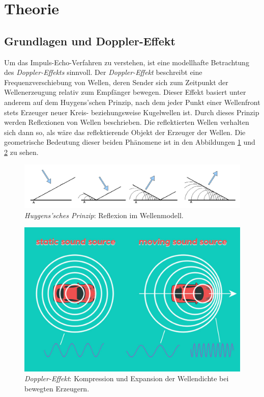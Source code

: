 \section{Theorie}
\label{sec:Theorie}
\subsection{Grundlagen und Doppler-Effekt}
Um das Impuls-Echo-Verfahren zu verstehen, ist eine modellhafte Betrachtung des \textit{Doppler-Effekts} sinnvoll.
Der \textit{Doppler-Effekt} beschreibt eine Frequenzverschiebung von Wellen, deren Sender sich zum Zeitpunkt der Wellenerzeugung relativ zum Empfänger bewegen.
Dieser Effekt basiert unter anderem auf dem Huygens'schen Prinzip, nach dem jeder Punkt einer Wellenfront stets Erzeuger neuer Kreis- beziehungsweise Kugelwellen ist.
Durch dieses Prinzip werden Reflexionen von Wellen beschrieben. Die reflektierten Wellen verhalten sich dann so, als wäre das reflektierende Objekt der Erzeuger der Wellen.
Die geometrische Bedeutung dieser beiden Phänomene ist in den Abbildungen \ref{fig:huygen} und \ref{fig:doppler} zu sehen.

\begin{figure}
    \centering
    \includegraphics[width=\textwidth]{media/Reflexion_im_Wellenmodell.png}
    \caption{\textit{Huygens'sches Prinzip}: Reflexion im Wellenmodell. \cite{HuygensWiki}}
    \label{fig:huygen}
\end{figure}

\begin{figure}
    \centering
    \includegraphics[width=.6\linewidth]{media/doppler-effect-header.jpg}
    \caption{\textit{Doppler-Effekt}: Kompression und Expansion der Wellendichte bei bewegten Erzeugern. \cite{doppler}}
    \label{fig:doppler}
\end{figure}

